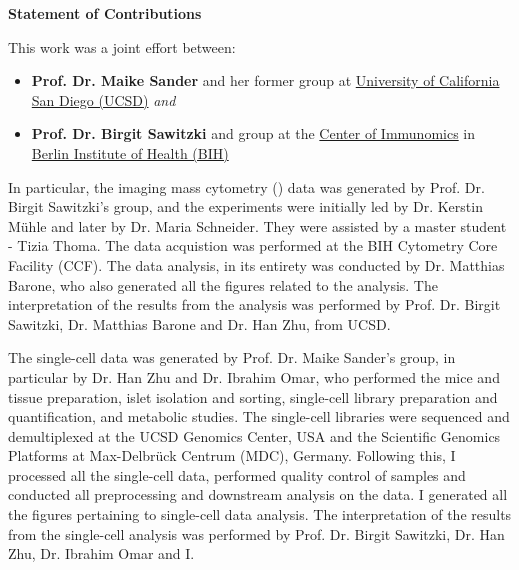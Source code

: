 \begin{Comment2}

\vspace{5mm}
\label{contr:chapter2}
\hspace{-3mm}
\textbf{\large Statement of Contributions} \\
\par This work was a joint effort between:
\begin{itemize}
  \item \textbf{Prof. Dr. Maike Sander} and her former group at \href{https://ucsd.edu/}{University of California San Diego (UCSD)} \textit{and}
  \item  \textbf{Prof. Dr. Birgit Sawitzki} and group at the \href{https://www.bihealth.org/de/forschung/sektionen/exploratory-diagnostic-sciences-eds/center-of-immunomics}{Center of Immunomics} in \href{https://www.bihealth.org/}{Berlin Institute of Health (BIH)}
\end{itemize}


\par In particular, the imaging mass cytometry () data was generated by Prof. Dr. Birgit Sawitzki's group, and the experiments were initially led by Dr. Kerstin Mühle and later by Dr. Maria Schneider. They were assisted by a master student - Tizia Thoma. The  data acquistion was performed at the BIH Cytometry Core Facility (CCF). The  data analysis, in its entirety was conducted by Dr. Matthias Barone, who also generated all the figures related to the  analysis. The interpretation of the results from the  analysis was performed by Prof. Dr. Birgit Sawitzki, Dr. Matthias Barone and Dr. Han Zhu, from UCSD.\\

\par The single-cell data was generated by Prof. Dr. Maike Sander's group, in particular by Dr. Han Zhu and Dr. Ibrahim Omar, who performed the mice and tissue preparation, islet isolation and sorting, single-cell library preparation and quantification, and metabolic studies. The single-cell libraries were sequenced and demultiplexed at the UCSD Genomics Center, USA and the Scientific Genomics Platforms at Max-Delbrück Centrum (MDC), Germany. Following this, I processed all the single-cell data, performed quality control of samples and conducted all preprocessing and downstream analysis on the data. I generated all the figures pertaining to single-cell data analysis. The interpretation of the results from the single-cell analysis was performed by Prof. Dr. Birgit Sawitzki, Dr. Han Zhu, Dr. Ibrahim Omar and I.\\


\end{Comment2}
